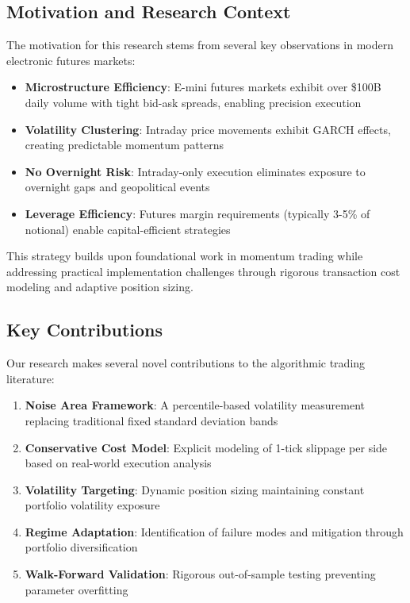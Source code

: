 \documentclass[twocolumn,ieee]{arithmaxresearch}
\begin{document}
\subsection{Motivation and Research Context}

The motivation for this research stems from several key observations in modern electronic futures markets:

\begin{itemize}
    \item \textbf{Microstructure Efficiency}: E-mini futures markets exhibit over \$100B daily volume with tight bid-ask spreads, enabling precision execution
    \item \textbf{Volatility Clustering}: Intraday price movements exhibit GARCH effects, creating predictable momentum patterns~\cite{engle1982arch}
    \item \textbf{No Overnight Risk}: Intraday-only execution eliminates exposure to overnight gaps and geopolitical events
    \item \textbf{Leverage Efficiency}: Futures margin requirements (typically 3-5\% of notional) enable capital-efficient strategies
\end{itemize}

This strategy builds upon foundational work in momentum trading while addressing practical implementation challenges through rigorous transaction cost modeling and adaptive position sizing.

\subsection{Key Contributions}

Our research makes several novel contributions to the algorithmic trading literature:

\begin{enumerate}
    \item \textbf{Noise Area Framework}: A percentile-based volatility measurement replacing traditional fixed standard deviation bands
    \item \textbf{Conservative Cost Model}: Explicit modeling of 1-tick slippage per side based on real-world execution analysis
    \item \textbf{Volatility Targeting}: Dynamic position sizing maintaining constant portfolio volatility exposure
    \item \textbf{Regime Adaptation}: Identification of failure modes and mitigation through portfolio diversification
    \item \textbf{Walk-Forward Validation}: Rigorous out-of-sample testing preventing parameter overfitting
\end{enumerate}
\end{document}
